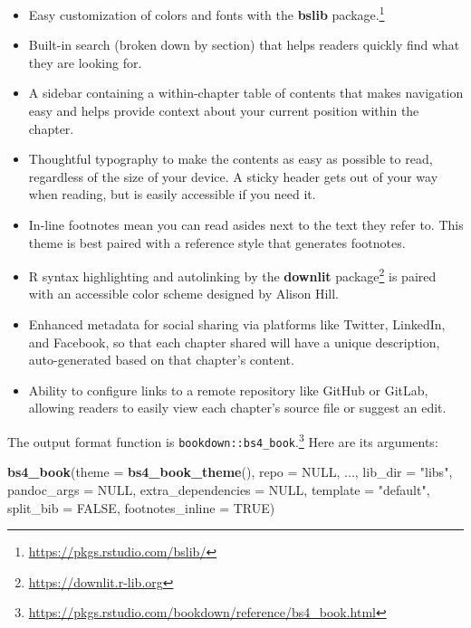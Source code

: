 \documentclass[
  12pt,
]{krantz}
\newenvironment{Shaded}{\begin{snugshade}}{\end{snugshade}}
\newcommand{\AttributeTok}[1]{\textcolor[rgb]{0.13,0.29,0.53}{#1}}
\newcommand{\ConstantTok}[1]{\textcolor[rgb]{0.56,0.35,0.01}{#1}}
\newcommand{\FunctionTok}[1]{\textcolor[rgb]{0.13,0.29,0.53}{\textbf{#1}}}
\newcommand{\NormalTok}[1]{#1}
\newcommand{\StringTok}[1]{\textcolor[rgb]{0.31,0.60,0.02}{#1}}
\renewcommand{\href}[2]{#2\footnote{\url{#1}}}
\theoremstyle{definition}
\theoremstyle{definition}
\theoremstyle{definition}
\theoremstyle{definition}
\theoremstyle{remark}
\begin{document}
\begin{itemize}
\item
  Easy customization of colors and fonts with
  \href{https://pkgs.rstudio.com/bslib/}{the \textbf{bslib} package.}
\item
  Built-in search (broken down by section) that helps readers quickly find what
  they are looking for.
\item
  A sidebar containing a within-chapter table of contents that makes
  navigation easy and helps provide context about your current position
  within the chapter.
\item
  Thoughtful typography to make the contents as easy as possible to read,
  regardless of the size of your device. A sticky header gets out of your
  way when reading, but is easily accessible if you need it.
\item
  In-line footnotes mean you can read asides next to the text they refer
  to. This theme is best paired with a reference style that generates
  footnotes.
\item
  R syntax highlighting and autolinking by
  \href{https://downlit.r-lib.org}{the \textbf{downlit} package} is paired with an accessible
  color scheme designed by Alison Hill.
\item
  Enhanced metadata for social sharing via platforms like Twitter, LinkedIn, and Facebook, so that each chapter shared will have a unique description, auto-generated based on that chapter's content.
\item
  Ability to configure links to a remote repository like GitHub or GitLab, allowing readers to easily view each chapter's source file or suggest an edit.
\end{itemize}

The output format function is \href{https://pkgs.rstudio.com/bookdown/reference/bs4_book.html}{\texttt{bookdown::bs4\_book}.} Here are its arguments:

\begin{Shaded}
\begin{Highlighting}[]
\FunctionTok{bs4\_book}\NormalTok{(}\AttributeTok{theme =} \FunctionTok{bs4\_book\_theme}\NormalTok{(), }\AttributeTok{repo =} \ConstantTok{NULL}\NormalTok{, ...,}
  \AttributeTok{lib\_dir =} \StringTok{"libs"}\NormalTok{, }\AttributeTok{pandoc\_args =} \ConstantTok{NULL}\NormalTok{, }\AttributeTok{extra\_dependencies =} \ConstantTok{NULL}\NormalTok{,}
  \AttributeTok{template =} \StringTok{"default"}\NormalTok{, }\AttributeTok{split\_bib =} \ConstantTok{FALSE}\NormalTok{, }\AttributeTok{footnotes\_inline =} \ConstantTok{TRUE}\NormalTok{)}
\end{Highlighting}
\end{Shaded}
\end{document}
